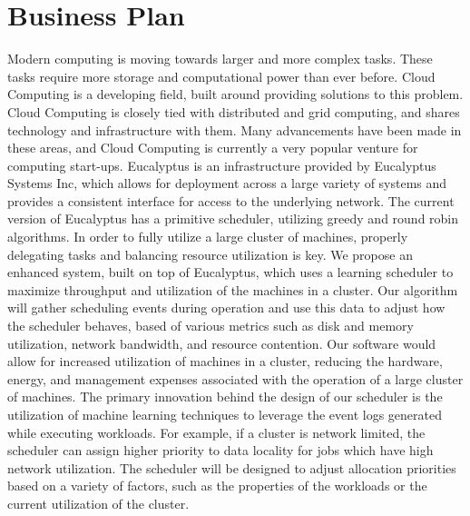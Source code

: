 \section{Business Plan}
  Modern computing is moving towards larger and more complex tasks.  These tasks require more storage and computational power than ever before.  Cloud Computing is a developing field, built around providing solutions to this problem.  Cloud Computing is closely tied with distributed and grid computing, and shares technology and infrastructure with them.  Many advancements have been made in these areas, and Cloud Computing is currently a very popular venture for computing start-ups.  
  Eucalyptus is an infrastructure provided by Eucalyptus Systems Inc, which allows for deployment across a large variety of systems and provides a consistent interface for access to the underlying network.  The current version of Eucalyptus has a primitive scheduler, utilizing greedy and round robin algorithms.  In order to fully utilize a large cluster of machines, properly delegating tasks and balancing resource utilization is key.  
  We propose an enhanced system, built on top of Eucalyptus, which uses a learning scheduler to maximize throughput and utilization of the machines in a cluster.  Our algorithm will gather scheduling events during operation and use this data to adjust how the scheduler behaves, based of various metrics such as disk and memory utilization, network bandwidth, and resource contention.  Our software would allow for increased utilization of machines in a cluster, reducing the hardware, energy, and management expenses associated with the operation of a large cluster of machines.
  The primary innovation behind the design of our scheduler is the utilization of machine learning techniques to leverage the event logs generated while executing workloads.  For example, if a cluster is network limited, the scheduler can assign higher priority to data locality for jobs which have high network utilization.  The scheduler will be designed to adjust allocation priorities based on a variety of factors, such as the properties of the workloads or the current utilization of the cluster.
